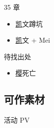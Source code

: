 \documentclass[a4paper]{article}
\begin{document}
35 章

\begin{itemize}
    \item \href{https://www.bilibili.com/video/BV1BT411S7q4/?t=122} 凯文蹲坑
    \item \href{https://www.bilibili.com/video/BV1BT411S7q4/?p=5&t=3265} 凯文 + Mei
\end{itemize}

待找出处

\begin{itemize}
    \item \href{https://www.bilibili.com/video/BV1it4y137GM/?t=109} 樱死亡
\end{itemize}

\subsection{可作素材}

活动 PV
\end{document}

